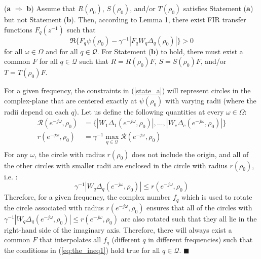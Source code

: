 \documentclass[journal]{IEEEtran}
\begin{document}
({\bf a} $\Rightarrow$ {\bf b}) Assume that $R(\rho_0)$,  $S(\rho_0)$, and/or $T(\rho_0)$ satisfies Statement ({\bf a}) but not Statement ({\bf b}). Then, according to Lemma 1, there exist FIR transfer functions $F_q(z^{-1})$ such that
\begin{equation} \label{eq:the_ineq1}
\Re\{ F_q\psi(\rho_0)- \gamma ^{-1}|F_qW_q \Delta_q(\rho_0)|\} > 0 
\end{equation} 
for all $\omega \in \Omega$ and for all $q \in \mathcal{Q}$. For Statement ({\bf b}) to hold, there must exist a common $F$  for all $q \in \mathcal{Q}$ such that  $R = R(\rho_0)F$, $S= S(\rho_0)F$, and/or $T = T(\rho_0)F$. 

For a given frequency, the constraints in (\ref{state_a}) will represent circles in the complex-plane that are centered exactly at $\psi(\rho_0)$ with varying radii (where the radii depend on each $q$). Let us define the following quantities at every $\omega \in \Omega$:
\begin{equation} 
\begin{aligned}
\mathscr{R}(e^{-j\omega},\rho_0) &= \{ |W_1 \Delta_1(e^{-j\omega},\rho_0)| , \ldots,|W_{c} \Delta_{c}(e^{-j\omega},\rho_0)|\}\\
r(e^{-j\omega},\rho_0) &=  \gamma^{-1}  \max_{q \in \mathcal{Q}}\mathscr{R}(e^{-j\omega},\rho_0) \\
\end{aligned}
\end{equation}
For any $\omega$, the circle with radius $r(\rho_0)$ does not include the origin, and all of the other circles with smaller radii are enclosed in the circle with radius $r(\rho_0)$, i.e. : 
$$\gamma^{-1}|W_q \Delta_q(e^{-j\omega},\rho_0)| \leq r(e^{-j\omega},\rho_0)$$ 
Therefore, for a given frequency, the complex number $f_q$ which is used to rotate the circle associated with radius $r(e^{-j\omega},\rho_0)$ ensures that all of the circles with $\gamma^{-1}|W_q \Delta_q(e^{-j\omega},\rho_0)| \leq r(e^{-j\omega},\rho_0)$ are also rotated such that they all lie in the right-hand side of the imaginary axis. Therefore, there will always exist a common $F$ that interpolates all $f_q$ (different $q$ in different frequencies) such that the conditions in (\ref{eq:the_ineq1}) hold true for all $q \in \mathcal{Q}$.
 {\hfill \ensuremath{\blacksquare}}
\end{document}

